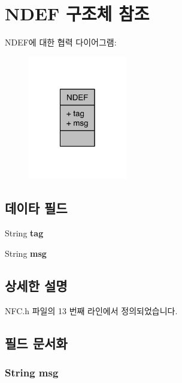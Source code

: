 \hypertarget{struct_n_d_e_f}{\section{N\-D\-E\-F 구조체 참조}
\label{struct_n_d_e_f}
}


N\-D\-E\-F에 대한 협력 다이어그램\-:\nopagebreak
\begin{figure}[H]
\begin{center}
\leavevmode
\includegraphics[width=122pt]{struct_n_d_e_f__coll__graph}
\end{center}
\end{figure}
\subsection*{데이타 필드}
\begin{DoxyCompactItemize}
\item 
\hypertarget{struct_n_d_e_f_a3d1b2b9aa7be6b4548fc2e6dbd97103f}{String {\bfseries tag}}\label{struct_n_d_e_f_a3d1b2b9aa7be6b4548fc2e6dbd97103f}

\item 
\hypertarget{struct_n_d_e_f_a05873af37984ef32c8ba2a6308956bb3}{String {\bfseries msg}}\label{struct_n_d_e_f_a05873af37984ef32c8ba2a6308956bb3}

\end{DoxyCompactItemize}


\subsection{상세한 설명}


N\-F\-C.\-h 파일의 13 번째 라인에서 정의되었습니다.



\subsection{필드 문서화}
\hypertarget{struct_n_d_e_f_a05873af37984ef32c8ba2a6308956bb3}{
\subsubsection[{msg}]{\setlength{\rightskip}{0pt plus 5cm}String msg}}\label{struct_n_d_e_f_a05873af37984ef32c8ba2a6308956bb3}


